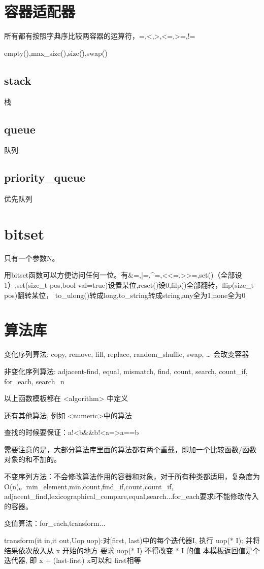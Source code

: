 \documentclass[UTF8]{ctexart}
\begin{document}
\section{容器适配器}
所有都有按照字典序比较两容器的运算符，=,<,>,<=,>=,!=

empty(),max_size(),size(),swap()
\subsection{stack}
栈
\subsection{queue}
队列
\subsection{priority_queue}
优先队列

\section{bitset}
只有一个参数N。

用bitset函数可以方便访问任何一位。有\&=,|=,^=,<<=,>>=,set()（全部设1）,set(size_t pos,bool val=true)设置某位,reset()设0,filp()全部翻转，flip(size_t pos)翻转某位，
to_ulong()转成long,to_string转成string,any全为1,none全为0

\section{算法库}
变化序列算法:
copy, remove, fill, replace, random_shuffle, swap, …
会改变容器

非变化序列算法:
adjacent-find, equal, mismatch, find, count, search,
count_if, for_each, search_n

以上函数模板都在 <algorithm> 中定义

还有其他算法, 例如 <numeric>中的算法

查找的时候要保证：a!<b&&b!<a=>a==b

需要注意的是，大部分算法库里面的算法都有两个重载，即加一个比较函数/函数对象的和不加的。

不变序列方法：不会修改算法作用的容器和对象，对于所有种类都适用，复杂度为O(n)。min_element,min,count,find_if,count,count_if,
adjacent_find,lexicographical_compare,equal,search...for_each要求f不能修改传入的容器。

变值算法：for_each,transform...

transform(it in,it out,Uop uop):对[first, last)中的每个迭代器I,
执行 uop(* I); 并将结果依次放入从 x 开始的地方
要求 uop(* I) 不得改变 * I 的值
本模板返回值是个迭代器, 即 x + (last-first)
x可以和 first相等
\end{document}
